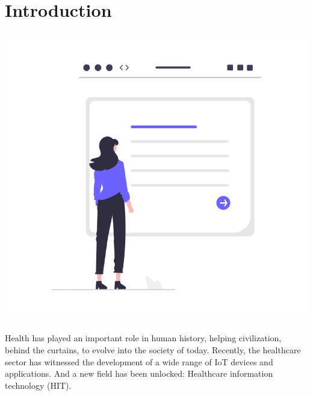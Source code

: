 
\chapter{Introduction}
\renewcommand{\thesection}{\arabic{section}}
		




\label{chapitre1}
		
		\includegraphics [width=1 \linewidth, height=0.8\textheight, keepaspectratio] {images/chaptersFigures/intro.png}
		
	
		
    \newpage
    \thispagestyle{plain}

Health has played an important role in human history, helping civilization, behind the curtains, to evolve into the society of today\cite{xu2020privacy}. Recently, the healthcare sector has witnessed the development of a wide range of IoT devices and applications\cite{nasiri2019security}. And a new field has been unlocked: Healthcare information technology (HIT).

